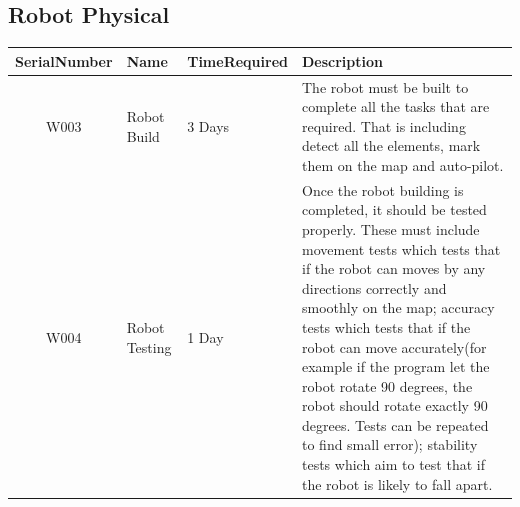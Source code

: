 \documentclass[11pt, a4paper]{report}
\begin{document}



\subsection{Robot Physical}
\begin{tabular}{|c|p{1cm}|p{3cm}|p{7cm}|}%
\hline
SerialNumber     &	Name 	&	TimeRequired		&	Description	       											\\ \hline
W003		&	Robot Build		& 3 Days		& The robot must be built to complete all the tasks that are required. That is including detect all the elements, mark them on the map and auto-pilot. \\ \hline
W004		&	Robot Testing	&	1 Day	& Once the robot building is completed, it should be tested properly. These must include movement tests which tests that if the robot can moves by any directions correctly and smoothly on the map; accuracy tests which tests that if the robot can move accurately(for example if the program let the robot rotate 90 degrees, the robot should rotate exactly 90 degrees. Tests can be repeated to find small error); stability tests which aim to test that if the robot is likely to fall apart.\\ \hline	
\end{tabular}
\end{document}
